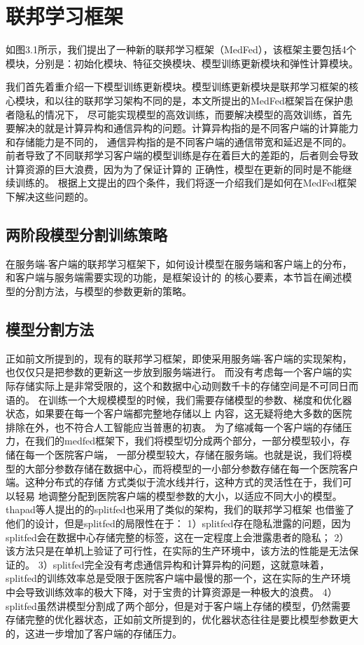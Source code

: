 \section{联邦学习框架}

如图3.1所示，我们提出了一种新的联邦学习框架（MedFed），该框架主要包括4个模块，分别是：初始化模块、特征交换模块、模型训练更新模块和弹性计算模块。

我们首先着重介绍一下模型训练更新模块。模型训练更新模块是联邦学习框架的核心模块，和以往的联邦学习架构不同的是，本文所提出的MedFed框架旨在保护患者隐私的情况下，
尽可能实现模型的高效训练，而要解决模型的高效训练，首先要解决的就是计算异构和通信异构的问题。计算异构指的是不同客户端的计算能力和存储能力是不同的，
通信异构指的是不同客户端的通信带宽和延迟是不同的。前者导致了不同联邦学习客户端的模型训练是存在着巨大的差距的，后者则会导致计算资源的巨大浪费，因为为了保证计算的
正确性，模型在更新的同时是不能继续训练的。
根据上文提出的四个条件，我们将逐一介绍我们是如何在MedFed框架下解决这些问题的。


\subsection{两阶段模型分割训练策略}

在服务端-客户端的联邦学习框架下，如何设计模型在服务端和客户端上的分布，和客户端与服务端需要实现的功能，是框架设计的
的核心要素，本节旨在阐述模型的分割方法，与模型的参数更新的策略。
\subsection{模型分割方法}
正如前文所提到的，现有的联邦学习框架，即使采用服务端-客户端的实现架构，也仅仅只是把参数的更新这一步放到服务端进行。
而没有考虑每一个客户端的实际存储实际上是非常受限的，这个和数据中心动则数千卡的存储空间是不可同日而语的。
在训练一个大规模模型的时候，我们需要存储模型的参数、梯度和优化器状态，如果要在每一个客户端都完整地存储以上
内容，这无疑将绝大多数的医院排除在外，也不符合人工智能应当普惠的初衷。
为了缩减每一个客户端的存储压力，在我们的medfed框架下，我们将模型切分成两个部分，一部分模型较小，存储在每一个医院客户端，
一部分模型较大，存储在服务端。也就是说，我们将模型的大部分参数存储在数据中心，而将模型的一小部分参数存储在每一个医院客户端。这种分布式的存储
方式类似于流水线并行\supercite{DBLP:journals/corr/abs-2104-04473, DBLP:journals/corr/abs-2006-09503}，这种方式的灵活性在于，我们可以轻易
地调整分配到医院客户端的模型参数的大小，以适应不同大小的模型。thapad等人提出的的splitfed\supercite{thapa2022splitfed}也采用了类似的架构，我们的联邦学习框架
也借鉴了他们的设计，但是splitfed的局限性在于：
1）splitfed存在隐私泄露的问题，因为splitfed会在数据中心存储完整的标签，这在一定程度上会泄露患者的隐私；
2）该方法只是在单机上验证了可行性，在实际的生产环境中，该方法的性能是无法保证的。
3）splitfed完全没有考虑通信异构和计算异构的问题，这就意味着，splitfed的训练效率总是受限于医院客户端中最慢的那一个，这在实际的生产环境中会导致训练效率的极大下降，对于宝贵的计算资源是一种极大的浪费。
4）splitfed虽然讲模型分割成了两个部分，但是对于客户端上存储的模型，仍然需要存储完整的优化器状态，正如前文所提到的，优化器状态往往是要比模型参数更大的，这进一步增加了客户端的存储压力。

